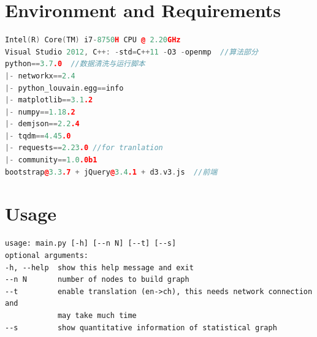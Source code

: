 \documentclass[UTF8, onecolumn, a4paper]{article}
\begin{document}
\fi
{}
\section{Environment and Requirements}
\begin{lstlisting}[title=Environment and Requirements,language=c++]
Intel(R) Core(TM) i7-8750H CPU @ 2.20GHz
Visual Studio 2012, C++: -std=C++11 -O3 -openmp  //算法部分
python==3.7.0  //数据清洗与运行脚本
|- networkx==2.4
|- python_louvain.egg==info
|- matplotlib==3.1.2
|- numpy==1.18.2
|- demjson==2.2.4
|- tqdm==4.45.0
|- requests==2.23.0 //for tranlation
|- community==1.0.0b1
bootstrap@3.3.7 + jQuery@3.4.1 + d3.v3.js  //前端
\end{lstlisting}
\section{Usage}
\begin{lstlisting}[title=Usage]
usage: main.py [-h] [--n N] [--t] [--s]
optional arguments:
-h, --help  show this help message and exit
--n N       number of nodes to build graph
--t         enable translation (en->ch), this needs network connection and
			may take much time
--s         show quantitative information of statistical graph
\end{lstlisting}
\end{document}

